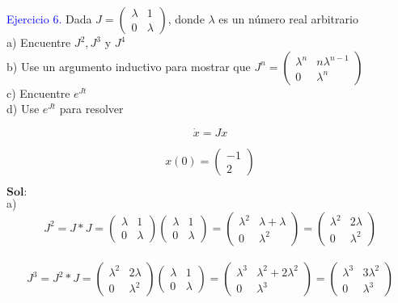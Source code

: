 \textcolor{blue}{Ejercicio 6.} Dada 
$J = \begin{pmatrix}
\lambda & 1\\
0 & \lambda
\end{pmatrix}$, donde $\lambda$ es un número real arbitrario\\

a) Encuentre $J^2, J^3$ y $J^4$\\

b) Use un argumento inductivo para mostrar que 
$J^n = \begin{pmatrix}
\lambda^n & n \lambda^{n-1}\\
0 & \lambda^n
\end{pmatrix}$\\

c) Encuentre $e^{Jt}$\\

d) Use $e^{Jt}$ para resolver 

$$\dot{x}= Jx$$ 

$$x(0)= \begin{pmatrix} -1\\2 \end{pmatrix}$$

$\mathbf{Sol:}$\\

a) $$J^2= J*J= 
\begin{pmatrix}
\lambda & 1\\
0 & \lambda
\end{pmatrix}
\begin{pmatrix}
\lambda & 1\\
0 & \lambda
\end{pmatrix}=
\begin{pmatrix}
\lambda^2 & \lambda + \lambda\\
0 & \lambda^2
\end{pmatrix}=
\begin{pmatrix}
\lambda^2 & 2\lambda\\
0 & \lambda^2
\end{pmatrix}$$\\

$$J^3= J^2 * J=
\begin{pmatrix}
\lambda^2 & 2\lambda\\
0 & \lambda^2
\end{pmatrix}
\begin{pmatrix}
\lambda & 1\\
0 & \lambda
\end{pmatrix}=
\begin{pmatrix}
\lambda^3 & \lambda^2 + 2\lambda^2\\
0 & \lambda^3
\end{pmatrix}=
\begin{pmatrix}
\lambda^3 & 3\lambda^2\\
0 & \lambda^3
\end{pmatrix}$$\\

